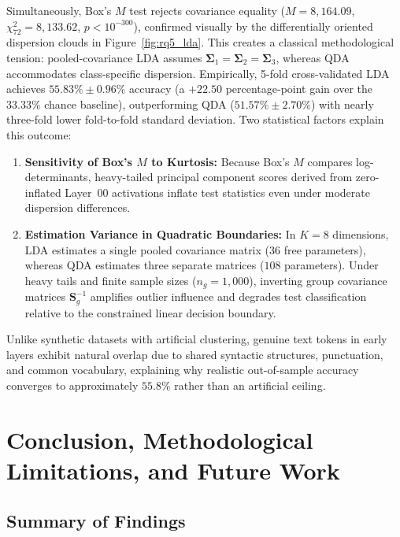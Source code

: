 \documentclass[12pt, a4paper, oneside]{report}
\theoremstyle{definition}
\newcommand{\mat}[1]{\mathbf{#1}}
\begin{document}
Simultaneously, Box's $M$ test rejects covariance equality ($M = 8{,}164.09$, $\chi^2_{72} = 8{,}133.62$, $p < 10^{-300}$), confirmed visually by the differentially oriented dispersion clouds in Figure~\ref{fig:rq5_lda}. This creates a classical methodological tension: pooled-covariance LDA assumes $\mat{\Sigma}_1 = \mat{\Sigma}_2 = \mat{\Sigma}_3$, whereas QDA accommodates class-specific dispersion. Empirically, 5-fold cross-validated LDA achieves $55.83\% \pm 0.96\%$ accuracy (a $+22.50$ percentage-point gain over the $33.33\%$ chance baseline), outperforming QDA ($51.57\% \pm 2.70\%$) with nearly three-fold lower fold-to-fold standard deviation. Two statistical factors explain this outcome:
\begin{enumerate}
    \item \textbf{Sensitivity of Box's $M$ to Kurtosis:} Because Box's $M$ compares log-determinants, heavy-tailed principal component scores derived from zero-inflated Layer~00 activations inflate test statistics even under moderate dispersion differences.
    \item \textbf{Estimation Variance in Quadratic Boundaries:} In $K = 8$ dimensions, LDA estimates a single pooled covariance matrix ($36$ free parameters), whereas QDA estimates three separate matrices ($108$ parameters). Under heavy tails and finite sample sizes ($n_g = 1{,}000$), inverting group covariance matrices $\mat{S}_g^{-1}$ amplifies outlier influence and degrades test classification relative to the constrained linear decision boundary.
\end{enumerate}

Unlike synthetic datasets with artificial clustering, genuine text tokens in early layers exhibit natural overlap due to shared syntactic structures, punctuation, and common vocabulary, explaining why realistic out-of-sample accuracy converges to approximately $55.8\%$ rather than an artificial ceiling.

\chapter{Conclusion, Methodological Limitations, and Future Work}

\section{Summary of Findings}
\end{document}
